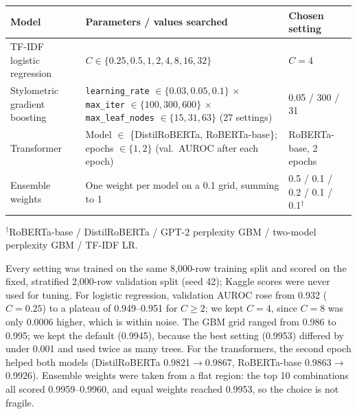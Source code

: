 \begin{center}
\small
\begin{tabular}{|l|p{8.2cm}|l|}
\hline
\textbf{Model} & \textbf{Parameters / values searched} & \textbf{Chosen setting} \\
\hline
TF-IDF logistic regression & $C \in \{0.25, 0.5, 1, 2, 4, 8, 16, 32\}$ & $C = 4$ \\
Stylometric gradient boosting & \texttt{learning\_rate} $\in \{0.03, 0.05, 0.1\}$ $\times$
\texttt{max\_iter} $\in \{100, 300, 600\}$ $\times$ \texttt{max\_leaf\_nodes} $\in \{15, 31, 63\}$
(27 settings) & 0.05 / 300 / 31 \\
Transformer & Model $\in$ \{DistilRoBERTa, RoBERTa-base\}; epochs $\in \{1, 2\}$
(val.\ AUROC after each epoch) & RoBERTa-base, 2 epochs \\
Ensemble weights & One weight per model on a 0.1 grid, summing to 1 & 0.5 / 0.1 / 0.2 / 0.1 / 0.1$^{\dagger}$ \\
\hline
\end{tabular}
\end{center}
{\footnotesize $^{\dagger}$RoBERTa-base / DistilRoBERTa / GPT-2 perplexity GBM /
two-model perplexity GBM / TF-IDF LR.}

Every setting was trained on the same 8,000-row training split and scored on the
fixed, stratified 2,000-row validation split (seed 42); Kaggle scores were never
used for tuning. For logistic regression, validation AUROC rose from 0.932
($C=0.25$) to a plateau of 0.949--0.951 for $C \ge 2$; we kept $C=4$, since
$C=8$ was only 0.0006 higher, which is within noise. The GBM grid ranged from
0.986 to 0.995; we kept the default (0.9945), because the best setting (0.9953)
differed by under 0.001 and used twice as many trees. For the transformers, the
second epoch helped both models (DistilRoBERTa 0.9821$\to$0.9867, RoBERTa-base
0.9863$\to$0.9926). Ensemble weights were taken from a flat region: the top 10
combinations all scored 0.9959--0.9960, and equal weights reached 0.9953, so
the choice is not fragile.

